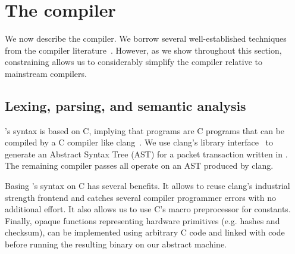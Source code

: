 \section{The \pktlanguage compiler}
\label{s:compiler}


We now describe the \pktlanguage compiler. We borrow several well-established
techniques from the compiler literature~\cite{muchnik}. However, as we show
throughout this section, constraining \pktlanguage allows us to considerably
simplify the \pktlanguage compiler relative to mainstream compilers.

\subsection{Lexing, parsing, and semantic analysis}
\pktlanguage's syntax is based on C, implying that \pktlanguage programs are C
programs that can be compiled by a C compiler like clang~\cite{clang}. We use
clang's library interface~\cite{libclang} to generate an Abstract Syntax Tree
(AST) for a packet transaction written in \pktlanguage. The remaining compiler
passes all operate on an AST produced by clang.

Basing \pktlanguage's syntax on C has several benefits. It allows to reuse
clang's industrial strength frontend and catches several compiler programmer
errors with no additional effort. It also allows us to use C's macro
preprocessor for constants. Finally, opaque functions representing hardware
primitives (e.g.  hashes and checksum), can be implemented using arbitrary C
code and linked with \pktlanguage code before running the resulting binary on
our abstract machine.

